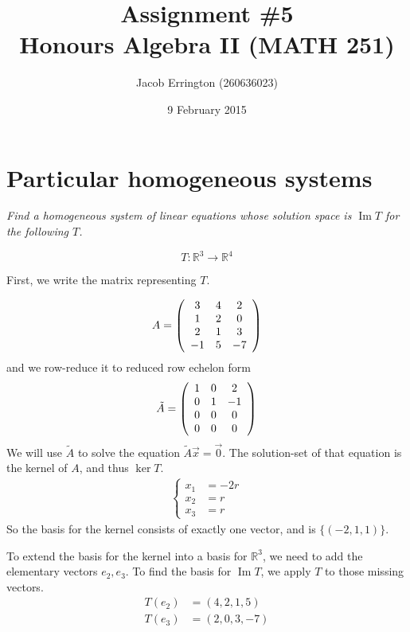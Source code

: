 \documentclass{article}
\author{Jacob Errington (260636023)}
\title{Assignment \#5\\Honours Algebra II (MATH 251)}
\date{9 February 2015}
\DeclareMathOperator{\im}{Im}
\newcommand{\R}{\mathbb{R}}
\begin{document}
\maketitle

\section{Particular homogeneous systems}

\emph{Find a homogeneous system of linear equations whose solution space is $\im{T}$ for the following $T$.}

$$
T : \R^3 \to \R^4
$$

First, we write the matrix representing $T$.

$$ A = \left(
    \begin{array}{c c c}
        3 & 4 & 2 \\
        1 & 2 & 0 \\
        2 & 1 & 3 \\
        -1 & 5 & -7
    \end{array}
\right) $$
and we row-reduce it to reduced row echelon form
$$ \tilde{A} = \left(
    \begin{array}{c c c}
        1 & 0 & 2 \\
        0 & 1 & -1 \\
        0 & 0 & 0 \\
        0 & 0 & 0
    \end{array}
\right)$$
We will use $\tilde{A}$ to solve the equation $\tilde{A} \vec{x} = \vec{0}$.
The solution-set of that equation is the kernel of $A$, and thus $\ker{T}$.
\begin{eqnarray*}
\left\{
    \begin{aligned}
        x_1 &= -2 r \\
        x_2 &= r \\
        x_3 &= r
    \end{aligned}
\right.
\end{eqnarray*}
So the basis for the kernel consists of exactly one vector, and is $\{(-2, 1, 1)\}$.

To extend the basis for the kernel into a basis for $\R^3$, we need to add the
elementary vectors $e_2, e_3$. To find the basis for $\im{T}$, we apply $T$ to
those missing vectors.
\begin{align*}
    T(e_2) &= (4, 2, 1, 5) \\
    T(e_3) &= (2, 0, 3, -7)
\end{align*}
\end{document}

